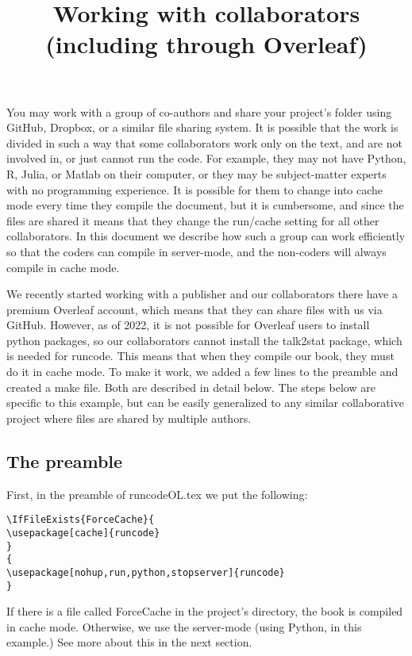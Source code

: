 \documentclass[12pt]{article}
\begin{document}
\title{Working with collaborators (including through Overleaf)}
\maketitle

You may work with a group of co-authors and share your project's folder using GitHub, Dropbox, or a similar file sharing system.
It is possible that the work is divided in such a way that some collaborators work only on the text, and are not involved in, or just cannot run the code. For example, they may not have Python, R, Julia, or Matlab on their computer, or they may be subject-matter experts with no programming experience.
It is possible for them to change into cache mode every time they compile the document, but it is cumbersome, and since the files are shared it means that they change the run/cache setting for all other collaborators. In this document we describe how such a group can work efficiently so that the coders can compile in server-mode, and the non-coders will always compile in cache mode.

We recently started working with a publisher and our collaborators there have a premium Overleaf account, which means that they can share files with us via GitHub. However, as of 2022, it is not possible for Overleaf users to install python packages, so our collaborators cannot install the talk2stat package, which is needed for runcode. This means that when they compile our book, they must do it in cache mode. To make it work, we added a few lines to the preamble and created a make file. Both are described in detail below. The steps below are specific to this example, but can be easily generalized to any similar collaborative project where files are shared by multiple authors. 

\subsection*{The preamble}

First, in the preamble of runcodeOL.tex we put the following:
\begin{tcolorbox}
\begin{Verbatim}
\IfFileExists{ForceCache}{
\usepackage[cache]{runcode} 
}
{
\usepackage[nohup,run,python,stopserver]{runcode}
}
\end{Verbatim}
\end{tcolorbox}

If there is a file called ForceCache in the project's directory, the book is compiled in cache mode. Otherwise, we use the server-mode (using Python, in this example.) See more about this in the next section.
\end{document}
